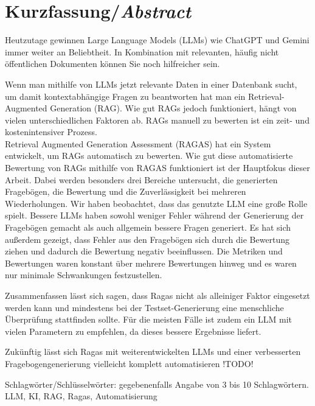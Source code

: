 \chapter*{Kurzfassung/\emph{Abstract}}
\label{chap:abstract}

Heutzutage gewinnen Large Language Models (LLMs) wie ChatGPT und Gemini immer weiter an Beliebtheit.
In Kombination mit relevanten, häufig nicht öffentlichen Dokumenten können Sie noch hilfreicher sein.

Wenn man mithilfe von LLMs jetzt relevante Daten in einer Datenbank sucht, um damit kontextabhängige Fragen zu beantworten hat man ein Retrieval-Augmented Generation (RAG).
Wie gut RAGs jedoch funktioniert, hängt von vielen unterschiedlichen Faktoren ab.
RAGs manuell zu bewerten ist ein zeit- und kostenintensiver Prozess.\\
Retrieval Augmented Generation Assessment (RAGAS) hat ein System entwickelt, um RAGs automatisch zu bewerten.
Wie gut diese automatisierte Bewertung von RAGs mithilfe von RAGAS funktioniert ist der Hauptfokus dieser Arbeit.
Dabei werden besonders drei Bereiche untersucht, die generierten Fragebögen, die Bewertung und die Zuverlässigkeit bei mehreren Wiederholungen.
Wir haben beobachtet, dass das genutzte LLM eine große Rolle spielt.
Bessere LLMs haben sowohl weniger Fehler während der Generierung der Fragebögen gemacht als auch allgemein bessere Fragen generiert.
Es hat sich außerdem gezeigt, dass Fehler aus den Fragebögen sich durch die Bewertung ziehen und dadurch die Bewertung negativ beeinflussen.
Die Metriken und Bewertungen waren konstant über mehrere Bewertungen hinweg und es waren nur minimale Schwankungen festzustellen.

Zusammenfassen lässt sich sagen, dass Ragas nicht als alleiniger Faktor eingesetzt werden kann und mindestens bei der Testset-Generierung eine menschliche Überprüfung stattfinden sollte.
Für die meisten Fälle ist zudem ein LLM mit vielen Parametern zu empfehlen, da dieses bessere Ergebnisse liefert.

Zukünftig lässt sich Ragas mit weiterentwickelten LLMs und einer verbesserten Fragebogengenerierung vielleicht komplett automatisieren
!TODO!




Schlagwörter/Schlüsselwörter: gegebenenfalls Angabe von 3 bis 10 Schlagwörtern.
LLM, KI, RAG, Ragas, Automatisierung